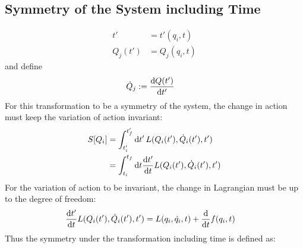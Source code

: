 \subsection{Symmetry of the System including Time}
\begin{align}
  t'      & = t'(q_i, t)  \\
  Q_j(t') & = Q_j(q_i, t)
\end{align}
and define
\begin{align}
  \dot{Q}_j & := \odv{Q(t')}{t'}
\end{align}
For this transformation to be a symmetry of the system, the change in action must keep the variation of action invariant:
\begin{align}
  S[Q_i] & = \int_{t_i'}^{t_f'} \odif{t'} \, L(Q_i(t'), \dot{Q}_i(t'), t')       \\
         & = \int_{t_i}^{t_f} \odif{t} \odv{t'}{t} L(Q_i(t'), \dot{Q}_i(t'), t')
\end{align}
For the variation of action to be invariant, the change in Lagrangian must be up to the degree of freedom:
\begin{align}
  \odv{t'}{t} L(Q_i(t'), \dot{Q}_i(t'), t') & = L(q_i, \dot{q}_i, t) + \odv{}{t} f(q_i, t)
\end{align}
Thus the symmetry under the transformation including time is defined as:



